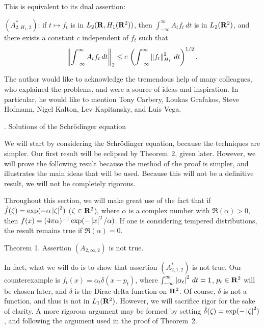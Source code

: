 \noindent This is equivalent to its dual assertion:

\assert $(A^*_{2,H_1,2})$:  if $t\mapsto f_t$ is in $L_2({\bf R},H_1({\bf R}^2))$,
then $\int_{-\infty}^\infty A_t f_t \, dt$ is in $L_2({\bf R}^2)$, and there
exists a constant $c$ independent of $f_t$ such that
$$ \left\|\int_{-\infty}^\infty A_t f_t\, dt\right\|_2 \le c \,
   \left(\int_{-\infty}^\infty \left\|f_t\right\|_{H_1}^2 \, dt \right)^{1/2} .$$

\noindent The author would like to acknowledge the tremendous help of many
colleagues, who explained the problems, and were a source of ideas and
inspiration.  In particular, he would like to mention 
Tony Carbery,
Loukas Grafakos,
Steve Hofmann,
Nigel Kalton,
Lev Kapitansky, and
Luis Vega.

. Solutions of the Schr\"odinger equation

We will start by considering the Schr\"odinger equation, because the
techniques are simpler.  Our first result will be eclipsed by Theorem~2,
given later.  However, we will prove the following result because the method
of the proof is simpler, and illustrates the main ideas that will be used.
Because this will not be a definitive result, we will not be completely
rigorous.

Throughout this section, we will make great use of the fact that if
$\hat f(\zeta) = \exp(-\alpha \left|\zeta\right|^2)$ ($\zeta\in{\bf R}^2$), where
$\alpha$ is a complex number with $\Re(\alpha) > 0$, then
$f(x) = (4 \pi \alpha)^{-1} \exp(-\left|x\right|^2 /\alpha)$.  If one is considering
tempered distributions, the result remains true if $\Re(\alpha) = 0$.

\proclaim Theorem 1. Assertion $(A_{2,\infty,2})$ is not true.

In fact, what we will do is to show that assertion $(A^*_{2,1,2})$ is not
true.
Our counterexample is $f_t(x) = \alpha_t \delta(x-p_t)$, where 
$\int_{-\infty}^\infty \left|\alpha_t\right|^2 \, dt = 1$, $p_t \in {\bf R}^2$ will
be chosen later,
and $\delta$ is the Dirac delta function on ${\bf R}^2$.  
Of course, $\delta$ is not a
function, and thus is not in $L_1({\bf R}^2)$.  However, 
we will sacrifice rigor
for the sake of clarity.  A more rigorous argument may be formed by
setting $\hat \delta(\zeta) = \exp(-\left|\zeta\right|^2)$, and following the
argument used in the proof of Theorem~2.

